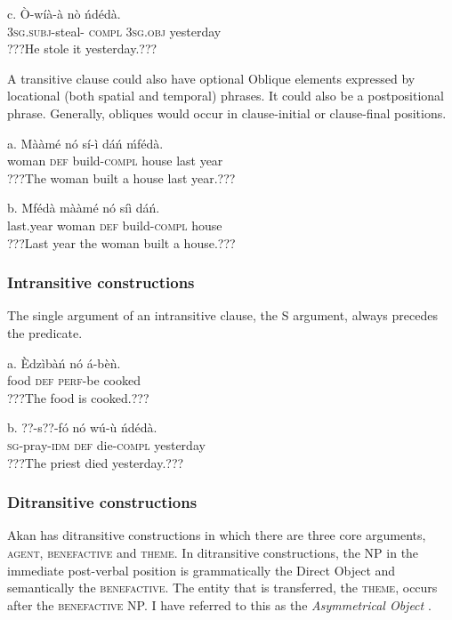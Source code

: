 \documentclass[output=paper]{langsci/langscibook}
\begin{document}
\ea
\gll  c.  \`{O}-wíà-à      nò    ńdédà.\\
       \textsc{3sg.subj}{}-steal-\textsc{ compl}  \textsc{3sg.obj}  yesterday\\
\glt   ???He stole it yesterday.???
\z

A transitive clause could also have optional Oblique elements expressed by locational (both spatial and temporal) phrases. It could also be a postpositional phrase. Generally, obliques would occur in clause-initial or clause-final positions. 

\ea
\gll a.  Mààmé    nó  sí-ì    dáń  ḿfédà.\\
       woman    \textsc{def}  build-\textsc{compl}  house  last year\\
\glt   ???The woman built a house last year.???
\z

\ea
\gll  b.  \'{M}fédà    mààmé    nó  síì    dáń.\\
       last.year  woman    \textsc{def}  build-\textsc{compl}  house\\
\glt   ???Last year the woman built a house.???
\z

\subsubsection{Intransitive constructions}

The single argument of an intransitive clause, the S argument, always precedes the predicate. 


\ea
\gll a.  \`{E}dzìbàń  nó  á-bèǹ.  \\
       food    \textsc{def}  \textsc{perf}{}-be cooked\\
\glt   ???The food is cooked.???  
\z

\ea
\gll b.  ??{}-s??-fó      nó  wú-\`{u}    ńdédà.\\
       \textsc{sg}{}-pray-\textsc{idm}    \textsc{def}  die-\textsc{compl}  yesterday\\
\glt   ???The priest died yesterday.???
\z

\subsubsection{Ditransitive constructions}

Akan has ditransitive constructions in which there are three core arguments, \textsc{agent, benefactive} and \textsc{theme}. In ditransitive constructions, the NP in the immediate post-verbal position is grammatically the Direct Object and semantically the \textsc{benefactive}. The entity that is transferred, the \textsc{theme}, occurs after the \textsc{benefactive} NP. I have referred to this as the \emph{Asymmetrical Object} \citep{Osam2000}.
\end{document}
